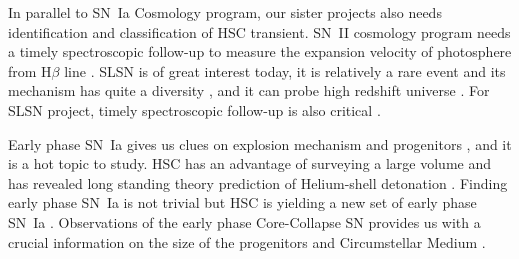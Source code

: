 \documentclass[useamsfonts]{pasj01}
\begin{document}
In parallel to SN~Ia Cosmology program, our sister projects also needs identification and classification of HSC transient.   
SN~II cosmology program needs a timely spectroscopic follow-up to measure the expansion velocity of photosphere from H$\beta$ line \citep{dejaeger17a}.
SLSN is of great interest today, it is relatively a rare event\citep{quimby11a} and its mechanism has quite a diversity \citep{galyam12a,Moriya18SLSN}, and it can probe high redshift universe \citep{cooke12a}.    
For SLSN project, timely spectroscopic follow-up is also critical \citep{moriya19a,curtin19a}.

Early phase SN~Ia gives us clues on explosion mechanism \citep{maeda18a} and progenitors \citep{cao15a}, and it is a hot topic to study.
HSC has an advantage of surveying a large volume and has revealed long standing theory prediction of Helium-shell detonation \citep{Jiang2017}.
Finding early phase SN~Ia is not trivial but HSC is yielding a new set of early phase SN~Ia \citep{Jiang_2020}.
Observations of the early phase Core-Collapse SN provides us with a crucial information on the size of the progenitors \citep{thompson03a,tominaga11a} and Circumstellar Medium \citep{forster18a}.  

%
%
%
%
%
\end{document}
